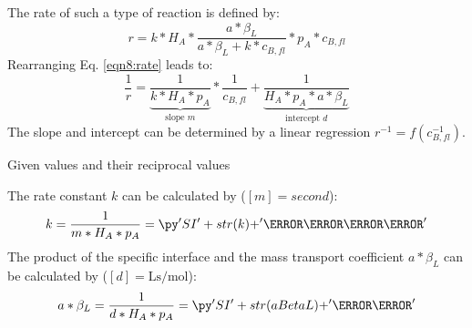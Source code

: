 \begin{solution}
The rate of such a type of reaction is defined by:
\begin{equation}\label{eqn8:rate}
 r = k * H_A * \frac{a * \beta_L}{a * \beta_L + k * c_{B,fl}} * p_A * c_{B,fl}
\end{equation}
Rearranging Eq. \ref{eqn8:rate} leads to:
\begin{equation}
 \frac{1}{r} = \underbrace{\frac{1}{k * H_A * p_A}}_{\text{slope } m} * \frac{1}{c_{B,fl}} + \underbrace{\frac{1}{H_A * p_A * a * \beta_L}}_{\text{intercept } d}
\end{equation}
The slope and intercept can be determined by a linear regression $r^{-1} = f\left(c_{B,fl}^{-1}\right)$.
\begin{table}[H]
\centering
\caption{Given values and their reciprocal values}
\label{tab8:1}
\end{table}
\begin{center}

\end{center}
The rate constant $k$ can be calculated by ($[m] = \si{second}$):
\begin{equation}
 k = \frac{1}{m * H_A * p_A} = \pySI{k}{\liter\per\mole\second}
\end{equation}
The product of the specific interface and the mass transport coefficient $a * \beta_L$ can be calculated by ($[d] = \si{\liter\second\per\mole}$):
\begingroup 
{}
\begin{equation}
 a * \beta_L = \frac{1}{d * H_A * p_A} = \pySI{aBetaL}{\per\second}
\end{equation}
\endgroup


\end{solution}

